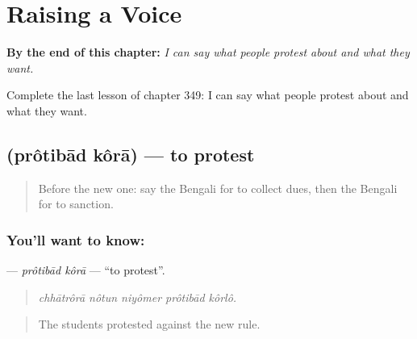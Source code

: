 
\chapter{Raising a Voice}
\label{ch:bn-raising-a-voice}

\begin{chapteropening}
\textbf{By the end of this chapter:} \emph{I can say what people protest about and what they want.}

Complete the last lesson of chapter 349: I can say what people protest about and what they want.
\end{chapteropening}

\section[\texorpdfstring{\bn{প্রতিবাদ} \bn{করা} (prôtibād kôrā)}{প্রতিবাদ করা (prôtibād kôrā)}]{  (prôtibād kôrā) — to protest}

\label{lesson:BN-C349-protibad-kora}



\begin{quote}
Before the new one: say the Bengali for to collect dues, then the Bengali for to sanction.
\end{quote}

\subsection*{You'll want to know:  }
\textbf{ } — \emph{prôtibād kôrā} — \textquotedblleft{}to protest\textquotedblright{}.

\begin{quote}
    
\end{quote}

\begin{quote}
\emph{chhātrôrā nôtun niyômer prôtibād kôrlô.}
\end{quote}

\begin{quote}
The students protested against the new rule.
\end{quote}

